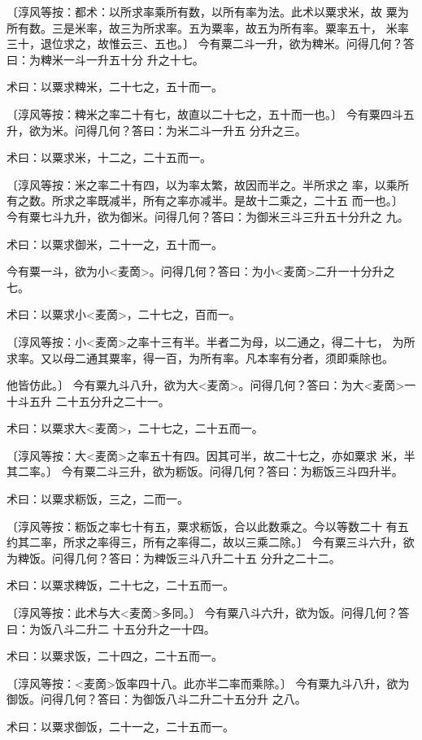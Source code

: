 \documentclass[a4paper,12pt,UTF8,twoside]{ctexbook}
\begin{document}
〔淳风等按：都术：以所求率乘所有数，以所有率为法。此术以粟求米，故 粟为所有数。三是米率，故三为所求率。五为粟率，故五为所有率。粟率五十， 米率三十，退位求之，故惟云三、五也。〕 今有粟二斗一升，欲为粺米。问得几何？答曰：为粺米一斗一升五十分 升之十七。

术曰：以粟求粺米，二十七之，五十而一。

〔淳风等按：粺米之率二十有七，故直以二十七之，五十而一也。〕 今有粟四斗五升，欲为米。问得几何？答曰：为米二斗一升五 分升之三。

术曰：以粟求米，十二之，二十五而一。

〔淳风等按：米之率二十有四，以为率太繁，故因而半之。半所求之 率，以乘所有之数。所求之率既减半，所有之率亦减半。是故十二乘之，二十五 而一也。〕 今有粟七斗九升，欲为御米。问得几何？答曰：为御米三斗三升五十分升之 九。

术曰：以粟求御米，二十一之，五十而一。

今有粟一斗，欲为小<麦啇>。问得几何？答曰：为小<麦啇>二升一十分升之 七。

术曰：以粟求小<麦啇>，二十七之，百而一。

〔淳风等按：小<麦啇>之率十三有半。半者二为母，以二通之，得二十七， 为所求率。又以母二通其粟率，得一百，为所有率。凡本率有分者，须即乘除也。

他皆仿此。〕 今有粟九斗八升，欲为大<麦啇>。问得几何？答曰：为大<麦啇>一十斗五升 二十五分升之二十一。

术曰：以粟求大<麦啇>，二十七之，二十五而一。

〔淳风等按：大<麦啇>之率五十有四。因其可半，故二十七之，亦如粟求 米，半其二率。〕 今有粟二斗三升，欲为粝饭。问得几何？答曰：为粝饭三斗四升半。

术曰：以粟求粝饭，三之，二而一。

〔淳风等按：粝饭之率七十有五，粟求粝饭，合以此数乘之。今以等数二十 有五约其二率，所求之率得三，所有之率得二，故以三乘二除。〕 今有粟三斗六升，欲为粺饭。问得几何？答曰：为粺饭三斗八升二十五 分升之二十二。

术曰：以粟求粺饭，二十七之，二十五而一。

〔淳风等按：此术与大<麦啇>多同。〕 今有粟八斗六升，欲为饭。问得几何？答曰：为饭八斗二升二 十五分升之一十四。

术曰：以粟求饭，二十四之，二十五而一。

〔淳风等按：<麦啇>饭率四十八。此亦半二率而乘除。〕 今有粟九斗八升，欲为御饭。问得几何？答曰：为御饭八斗二升二十五分升 之八。

术曰：以粟求御饭，二十一之，二十五而一。
\end{document}
